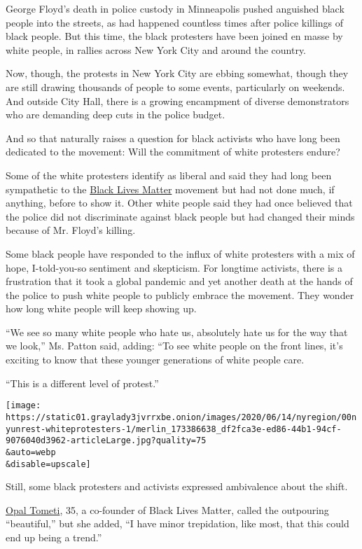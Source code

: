 George Floyd's death in police custody in Minneapolis pushed anguished
black people into the streets, as had happened countless times after
police killings of black people. But this time, the black protesters
have been joined en masse by white people, in rallies across New York
City and around the country.

Now, though, the protests in New York City are ebbing somewhat, though
they are still drawing thousands of people to some events, particularly
on weekends. And outside City Hall, there is a growing encampment of
diverse demonstrators who are demanding deep cuts in the police budget.

And so that naturally raises a question for black activists who have
long been dedicated to the movement: Will the commitment of white
protesters endure?

Some of the white protesters identify as liberal and said they had long
been sympathetic to the \href{https://blacklivesmatter.com/}{Black Lives
Matter} movement but had not done much, if anything, before to show it.
Other white people said they had once believed that the police did not
discriminate against black people but had changed their minds because of
Mr. Floyd's killing.

Some black people have responded to the influx of white protesters with
a mix of hope, I-told-you-so sentiment and skepticism. For longtime
activists, there is a frustration that it took a global pandemic and yet
another death at the hands of the police to push white people to
publicly embrace the movement. They wonder how long white people will
keep showing up.

``We see so many white people who hate us, absolutely hate us for the
way that we look,'' Ms. Patton said, adding: ``To see white people on
the front lines, it's exciting to know that these younger generations of
white people care.

``This is a different level of protest.''

\texttt{[image: https://static01.graylady3jvrrxbe.onion/images/2020/06/14/nyregion/00nyunrest-whiteprotesters-1/merlin\_173386638\_df2fca3e-ed86-44b1-94cf-9076040d3962-articleLarge.jpg?quality=75\\\&auto=webp\\\&disable=upscale]}

Still, some black protesters and activists expressed ambivalence about
the shift.

\href{https://www.opaltometi.org/}{Opal Tometi}, 35, a co-founder of
Black Lives Matter, called the outpouring ``beautiful,'' but she added,
``I have minor trepidation, like most, that this could end up being a
trend.''

